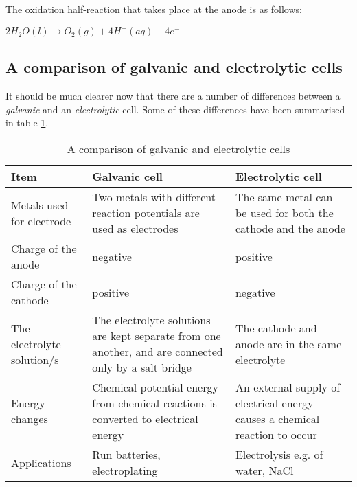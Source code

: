 The oxidation half-reaction that takes place at the anode is as follows:
\begin{center}
\rm${2H_{2}O(l) \rightarrow O_{2}(g) + 4H^{+}(aq) + 4e^{-}}$
\end{center}

\subsection{A comparison of galvanic and electrolytic cells}

It should be much clearer now that there are a number of differences between a \textit{galvanic} and an \textit{electrolytic} cell. Some of these differences have been summarised in table \ref{tab:electrochemical:comparison}.

\begin{table}[h]
\begin{center}
\begin{tabular}{|p{4cm}|p{4cm}|p{4cm}|}\hline
\textbf{Item} & \textbf{Galvanic cell} & \textbf{Electrolytic cell}\\\hline
Metals used for electrode & Two metals with different reaction potentials are used as electrodes & The same metal can be used for both the cathode and the anode \\\hline
Charge of the anode & negative & positive \\\hline
Charge of the cathode & positive & negative \\\hline
The electrolyte solution/s & The electrolyte solutions are kept separate from one another, and are connected only by a salt bridge & The cathode and anode are in the same electrolyte \\\hline
Energy changes & Chemical potential energy from chemical reactions is converted to electrical energy & An external supply of electrical energy causes a chemical reaction to occur \\\hline
Applications & Run batteries, electroplating & Electrolysis e.g. of water, NaCl \\\hline

\end{tabular}
\end{center}
\caption{A comparison of galvanic and electrolytic cells}
\label{tab:electrochemical:comparison}
\end{table} 

